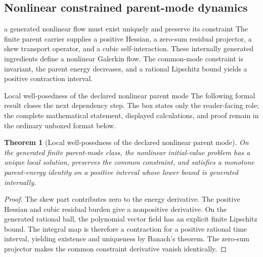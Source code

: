 \documentclass[11pt]{article}
\numberwithin{equation}{section}
\newtheorem{theorem}[definition]{Theorem}
\theoremstyle{remark}
\begin{document}
\subsection{Nonlinear constrained parent-mode dynamics}
\begin{interpretivebridge}{a generated nonlinear flow must exist uniquely and preserve its constraint}
The finite parent carrier supplies a positive Hessian, a zero-sum residual projector, a skew transport operator, and a cubic self-interaction. These internally generated ingredients define a nonlinear Galerkin flow. The common-mode constraint is invariant, the parent energy decreases, and a rational Lipschitz bound yields a positive contraction interval.
\end{interpretivebridge}
\begin{proofguide}{Local well-posedness of the declared nonlinear parent mode}
The following formal result closes the next dependency step. The box states only the reader-facing role; the complete mathematical statement, displayed calculations, and proof remain in the ordinary unboxed format below.
\end{proofguide}
\begin{theorem}[Local well-posedness of the declared nonlinear parent mode]
On the generated finite parent-mode class, the nonlinear initial-value problem has a unique local solution, preserves the common constraint, and satisfies a monotone parent-energy identity on a positive interval whose lower bound is generated internally.
\end{theorem}
\begin{proof}
The skew part contributes zero to the energy derivative. The positive Hessian and cubic residual burden give a nonpositive derivative. On the generated rational ball, the polynomial vector field has an explicit finite Lipschitz bound. The integral map is therefore a contraction for a positive rational time interval, yielding existence and uniqueness by Banach's theorem. The zero-sum projector makes the common constraint derivative vanish identically.
\end{proof}
\end{document}

